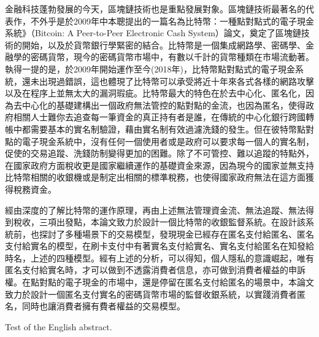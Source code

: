 
\begin{cabstract}
	金融科技蓬勃發展的今天，區塊鏈技術也是重點發展對象。區塊鏈技術最著名的代表作，不外乎是於2009年中本聰提出的一篇名為比特幣：一種點對點式的電子現金系統》（Bitcoin: A Peer-to-Peer Electronic Cash System）論文\parencite{bitcoinpaper}，奠定了區塊鏈技術的開始，以及於貨幣銀行學緊密的結合。比特幣是一個集成網路學、密碼學、金融學的密碼貨幣，現今的密碼貨幣市場中，有數以千計的貨幣種類在市場流動著。執得一提的是，於2009年開始運作至今(2018年)，比特幣點對點式的電子現金系統，還未出現過錯誤，這也體現了比特幣可以承受將近十年來各式各樣的網路攻擊以及在程序上並無太大的漏洞瑕疵。比特幣最大的特色在於去中心化、匿名化，因為去中心化的基礎建構出一個政府無法管控的點對點的金流，也因為匿名，使得政府相關人士難你去追查每一筆資金的真正持有者是誰，在傳統的中心化銀行跨國轉帳中都需要基本的實名制驗證，藉由實名制有效過濾洗錢的發生。但在彼特幣點對點的電子現金系統中，沒有任何一個使用者或是政府可以要求每一個人的實名制，促使的交易追蹤、洗錢防制變得更加的困難。除了不可管控、難以追蹤的特點外，在國家政府方面稅收更是國家繼續運作的基礎資金來源，因為現今的國家並無支持比特幣相關的收銀機或是制定出相關的標準稅務，也使得國家政府無法在這方面獲得稅務資金。

	經由深度的了解比特幣的運作原理，再由上述無法管理資金流、無法追蹤、無法得到稅收，三項出發點，本論文致力於設計一個比特幣的收銀監督系統。在設計該系統前，也探討了多種場景下的交易模型，發現現金已經存在匿名支付給匿名、匿名支付給實名的模型，在刷卡支付中有著實名支付給實名、實名支付給匿名在知發給時名，上述的四種模型。經有上述的分析，可以得知，個人隱私的意識崛起，唯有匿名支付給實名時，才可以做到不透露消費者信息，亦可做到消費者權益的申訴權。在點對點的電子現金的市場中，還是停留在匿名支付給匿名的場景中，本論文致力於設計一個匿名支付實名的密碼貨幣市場的監督收銀系統，以實踐消費者匿名，同時也讓消費者擁有費者權益的交易模型。
\end{cabstract}

\begin{eabstract}
	Test of the English abstract.
\end{eabstract}

